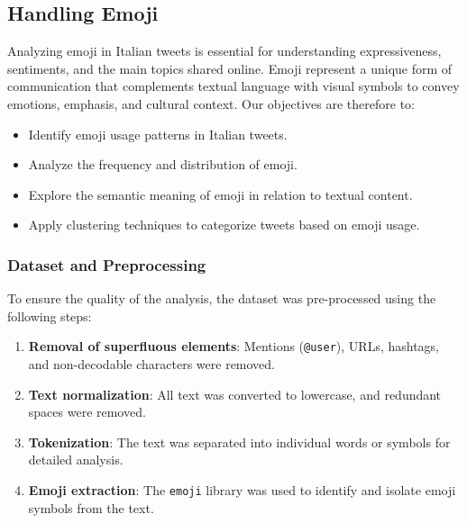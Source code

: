 \subsection{Handling Emoji}

Analyzing emoji in Italian tweets is essential for understanding expressiveness, sentiments, and the main topics shared online. Emoji represent a unique form of communication that complements textual language with visual symbols to convey emotions, emphasis, and cultural context. Our objectives are therefore to:
\begin{itemize}
    \item Identify emoji usage patterns in Italian tweets.
    \item Analyze the frequency and distribution of emoji.
    \item Explore the semantic meaning of emoji in relation to textual content.
    \item Apply clustering techniques to categorize tweets based on emoji usage.
\end{itemize}

\subsubsection{Dataset and Preprocessing}
To ensure the quality of the analysis, the dataset was pre-processed using the following steps:
\begin{enumerate}
    \item \textbf{Removal of superfluous elements}: Mentions (\texttt{@user}), URLs, hashtags, and non-decodable characters were removed.
    \item \textbf{Text normalization}: All text was converted to lowercase, and redundant spaces were removed.
    \item \textbf{Tokenization}: The text was separated into individual words or symbols for detailed analysis.
    \item \textbf{Emoji extraction}: The \texttt{emoji} library was used to identify and isolate emoji symbols from the text.
\end{enumerate}

